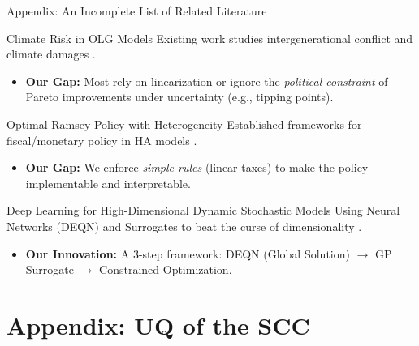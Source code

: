 \documentclass[10pt,aspectratio=169]{beamer}
\begin{document}
\begin{frame}{Appendix: An Incomplete List of Related Literature}
    \footnotesize
    \begin{block}{Climate Risk in OLG Models}
        Existing work studies intergenerational conflict and climate damages \citep{kotlikoff2021making, weitzman2012ghg, Karp2014}.
        \begin{itemize}
            \item[\textcolor{blue}{\textbf{+}}] \textbf{Our Gap:} Most rely on linearization or ignore the \textit{political constraint} of Pareto improvements under uncertainty (e.g., tipping points).
        \end{itemize}
    \end{block}
    \begin{block}{Optimal Ramsey Policy with Heterogeneity}
        Established frameworks for fiscal/monetary policy in HA models \citep{bhandari2013taxes, nuno2020Optimal, douenne_hummel_pedroni_2024}.
        \begin{itemize}
             \item[\textcolor{blue}{\textbf{+}}] \textbf{Our Gap:} We enforce \textit{simple rules} (linear taxes) to make the policy implementable and interpretable.
        \end{itemize}
    \end{block}
    \begin{block}{Deep Learning for High-Dimensional Dynamic Stochastic Models}
        Using Neural Networks (DEQN) and Surrogates to beat the curse of dimensionality \citep{azinovic_et_al_2019, friedlDeep2023}.
        \begin{itemize}
             \item[\textcolor{blue}{\textbf{+}}] \textbf{Our Innovation:} A 3-step framework: DEQN (Global Solution) $\to$ GP Surrogate $\to$ Constrained Optimization.
        \end{itemize}
    \end{block}
\end{frame}

\section{Appendix: UQ of the SCC}
\end{document}
